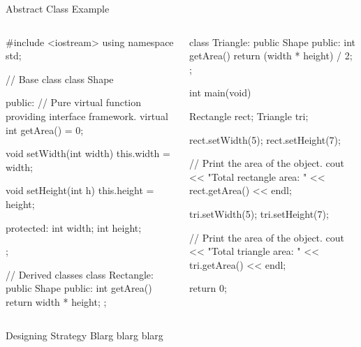 \documentclass[../lecture5-objectorientation.tex]{subfiles}
\begin{document}
\begin{frame}[fragile]{Abstract Class Example}
    \begin{columns}[T,onlytextwidth]
            \begin{cppcode}[lastline=34]
#include <iostream>
using namespace std;

// Base class
class Shape
{
    public:
        // Pure virtual function providing interface framework.
        virtual int getArea() = 0;

        void setWidth(int width)
        {
            this.width = width;
        }

        void setHeight(int h)
        {
            this.height = height;
        }

    protected:
        int width;
        int height;
};

// Derived classes
class Rectangle: public Shape
{
    public:
        int getArea()
        {
            return width * height;
        }
};
            \end{cppcode}
            \begin{cppcode}[lastline=28]
class Triangle: public Shape
{
    public:
        int getArea()
        {
            return (width * height) / 2;
        }
};

int main(void)
{
    Rectangle rect;
    Triangle  tri;

    rect.setWidth(5);
    rect.setHeight(7);

    // Print the area of the object.
    cout << "Total rectangle area: " << rect.getArea() << endl;

    tri.setWidth(5);
    tri.setHeight(7);

    // Print the area of the object.
    cout << "Total triangle area: " << tri.getArea() << endl;

    return 0;
}
            \end{cppcode}
    \end{columns}
\end{frame}


\begin{frame}[fragile]{Designing Strategy}
    Blarg blarg blarg
\end{frame}

\end{document}
